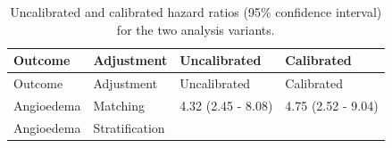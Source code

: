 \documentclass[11pt]{book}
\theoremstyle{definition}
\theoremstyle{definition}
\theoremstyle{definition}
\theoremstyle{remark}
\begin{document}
\begin{longtable}[]{@{}llll@{}}
\caption{\label{tab:sensAnalysis} Uncalibrated and calibrated hazard ratios (95\% confidence interval) for the two analysis variants.}\tabularnewline
\toprule
\begin{minipage}[b]{0.32\columnwidth}\raggedright
Outcome\strut
\end{minipage} & \begin{minipage}[b]{0.17\columnwidth}\raggedright
Adjustment\strut
\end{minipage} & \begin{minipage}[b]{0.20\columnwidth}\raggedright
Uncalibrated\strut
\end{minipage} & \begin{minipage}[b]{0.20\columnwidth}\raggedright
Calibrated\strut
\end{minipage}\tabularnewline
\midrule
\endfirsthead
\toprule
\begin{minipage}[b]{0.32\columnwidth}\raggedright
Outcome\strut
\end{minipage} & \begin{minipage}[b]{0.17\columnwidth}\raggedright
Adjustment\strut
\end{minipage} & \begin{minipage}[b]{0.20\columnwidth}\raggedright
Uncalibrated\strut
\end{minipage} & \begin{minipage}[b]{0.20\columnwidth}\raggedright
Calibrated\strut
\end{minipage}\tabularnewline
\midrule
\endhead
\begin{minipage}[t]{0.32\columnwidth}\raggedright
Angioedema\strut
\end{minipage} & \begin{minipage}[t]{0.17\columnwidth}\raggedright
Matching\strut
\end{minipage} & \begin{minipage}[t]{0.20\columnwidth}\raggedright
4.32 (2.45 - 8.08)\strut
\end{minipage} & \begin{minipage}[t]{0.20\columnwidth}\raggedright
4.75 (2.52 - 9.04)\strut
\end{minipage}\tabularnewline
\begin{minipage}[t]{0.32\columnwidth}\raggedright
Angioedema\strut
\end{minipage} & \begin{minipage}[t]{0.17\columnwidth}\raggedright
Stratification\strut
\end{minipage} & \begin{minipage}[t]{0.20\columnwidth}\raggedright

\end{minipage}
\end{longtable}
\end{document}
